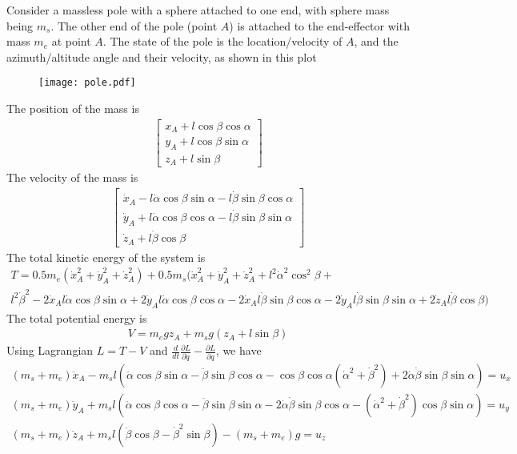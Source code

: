 \documentclass{article}
\begin{document}
Consider a massless pole with a sphere attached to one end, with sphere mass being $m_s$. The other end of the pole (point $A$) is attached to the end-effector with mass $m_e$ at point $A$. The state of the pole is the location/velocity of $A$, and the azimuth/altitude angle and their velocity, as shown in this plot

\begin{figure}
	\centering
	\texttt{[image: pole.pdf]}
\end{figure}

The position of the mass is
\begin{align}
	\begin{bmatrix}
		x_A + l\cos\beta\cos\alpha\\
		y_A + l\cos\beta\sin\alpha\\
		z_A + l\sin\beta
	\end{bmatrix}
\end{align}
The velocity of the mass is
\begin{align}
	\begin{bmatrix}
		\dot{x}_A - l\dot{\alpha}\cos\beta\sin\alpha - l\dot{\beta}\sin\beta\cos\alpha\\
		\dot{y}_A + l\dot{\alpha}\cos\beta\cos\alpha - l\dot{\beta}\sin\beta\sin\alpha\\
		\dot{z}_A + l\dot{\beta}\cos\beta
	\end{bmatrix}
\end{align}
The total kinetic energy of the system is
\begin{multline}
	T = 0.5 m_e (\dot{x}_A^2 + \dot{y}_A^2 +\dot{z}_A^2) + 0.5 m_s(\dot{x}_A^2 + \dot{y}_A^2 + \dot{z}_A^2 + l^2\dot{\alpha}^2\cos^2\beta +\\
	l^2\dot{\beta}^2 - 2\dot{x}_Al\dot{\alpha}\cos\beta\sin\alpha + 2\dot{y}_Al\dot{\alpha}\cos\beta\cos\alpha - 2\dot{x}_Al\dot{\beta}\sin\beta\cos\alpha - 2\dot{y}_Al\dot{\beta}\sin\beta\sin\alpha + 2\dot{z}_Al\dot{\beta}\cos\beta) 
\end{multline}
The total potential energy is
\begin{align}
	V = m_egz_A + m_sg(z_A + l\sin\beta)
\end{align}
Using Lagrangian $L = T-V$ and $\frac{d}{dt}\frac{\partial L}{\partial \dot{q}}-\frac{\partial L}{\partial q}$, we have
\begin{align}
	(m_s + m_e)\ddot{x}_A - m_sl(\ddot{\alpha}\cos\beta\sin\alpha - \ddot{\beta}\sin\beta\cos\alpha - \cos\beta\cos\alpha(\dot{\alpha}^2+\dot{\beta}^2) + 2\dot{\alpha}\dot{\beta}\sin\beta\sin\alpha) = u_x\\
	(m_s + m_e)\ddot{y}_A +m_sl(\ddot{\alpha}\cos\beta\cos\alpha-\ddot{\beta}\sin\beta\sin\alpha-2\dot{\alpha}\dot{\beta}\sin\beta\cos\alpha-(\dot{\alpha}^2+\dot{\beta}^2)\cos\beta\sin\alpha) = u_y\\
	(m_s + m_e)\ddot{z}_A + m_sl(\ddot{\beta}\cos\beta - \dot{\beta}^2\sin\beta) - (m_s+m_e)g = u_z
\end{align}
\end{document}
